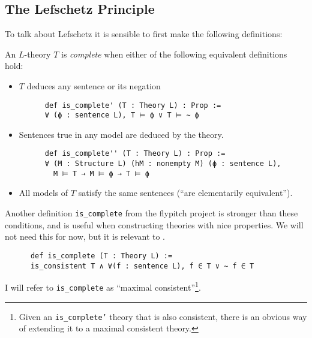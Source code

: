 \subsection{The Lefschetz Principle}

To talk about Lefschetz it is sensible to first make the following definitions:

\begin{dfn}
    An $L$-theory $T$ is \textit{complete}
    when either of the following equivalent definitions hold:
    \begin{itemize}
      \item  $T$ deduces any sentence or its negation
    \begin{lstlisting}
      def is_complete' (T : Theory L) : Prop :=
      ∀ (ϕ : sentence L), T ⊨ ϕ ∨ T ⊨ ∼ ϕ \end{lstlisting}
      \item Sentences true in any model are deduced by the theory.
    \begin{lstlisting}
      def is_complete'' (T : Theory L) : Prop :=
      ∀ (M : Structure L) (hM : nonempty M) (ϕ : sentence L),
        M ⊨ T → M ⊨ ϕ → T ⊨ ϕ \end{lstlisting}
      \item All models of $T$ satisfy the same sentences
            (``are elementarily equivalent'').
    \end{itemize}

    Another definition \texttt{is\_complete} from the flypitch project
    is stronger than these conditions, and is useful when constructing
    theories with nice properties.
    We will not need this for now, but it is relevant to .
    \begin{lstlisting}
      def is_complete (T : Theory L) :=
      is_consistent T ∧ ∀(f : sentence L), f ∈ T ∨ ∼ f ∈ T \end{lstlisting}
    I will refer to \texttt{is\_complete} as ``maximal consistent''\footnote{
      Given an \texttt{is\_complete'} theory that is also consistent,
      there is an obvious way of extending it to a maximal consistent theory.}.
\end{dfn}
